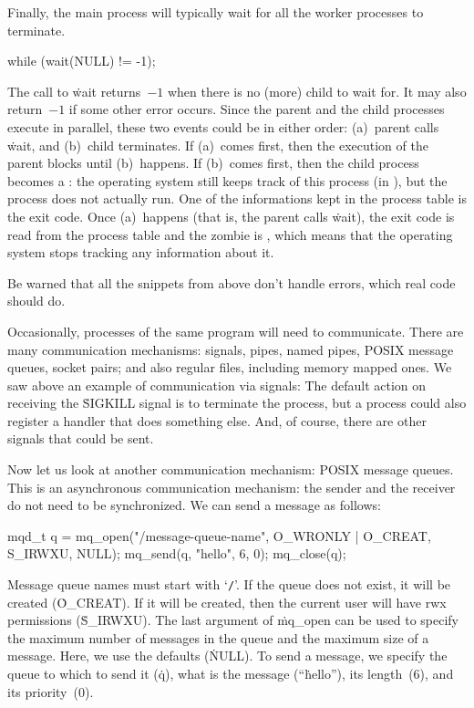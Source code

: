 Finally,
  the main process will typically wait for all the worker processes to terminate.
\begin{ccode}
while (wait(NULL) != -1);
\end{ccode}
The call to \.{wait} returns~$-1$ when there is no (more) child to wait for.
It may also return~$-1$ if some other error occurs.
Since the parent and the child processes execute in parallel,
  these two events could be in either order:
  (a)~parent calls \.{wait}, and
  (b)~child terminates.
If (a)~comes first, then the execution of the parent blocks until (b)~happens.
If (b)~comes first, then the child process becomes a :
  the operating system still keeps track of this process (in ),
  but the process does not actually run.
One of the informations kept in the process table is the exit code.
Once (a)~happens (that is, the parent calls \.{wait}),
  the exit code is read from the process table and the zombie is ,
  which means that the operating system stops tracking any information about it.

Be warned that all the snippets from above don't handle errors,
  which real code should do.

\medskip

Occasionally, processes of the same program will need to communicate.
There are many communication mechanisms:
  signals, pipes, named pipes, POSIX message queues, socket pairs;
  and also regular files, including memory mapped ones.
We saw above an example of communication via signals:
The default action on receiving the \.{SIGKILL} signal is to terminate the process,
  but a process could also register a handler that does something else.
And, of course, there are other signals that could be sent.

Now let us look at another communication mechanism: POSIX message queues.
This is an asynchronous communication mechanism:
  the sender and the receiver do not need to be synchronized.
We can send a message as follows:
\begin{ccode}
mqd_t q = mq_open("/message-queue-name", O_WRONLY | O_CREAT, S_IRWXU, NULL);
mq_send(q, "hello", 6, 0);
mq_close(q);
\end{ccode}
Message queue names must start with `{\tt /}'.
If the queue does not exist, it will be created (\.{O\_CREAT}).
If it will be created, then the current user will have rwx permissions (\.{S\_IRWXU}).
The last argument of \.{mq\_open} can be used to specify
  the maximum number of messages in the queue
  and the maximum size of a message.
Here, we use the defaults (\.{NULL}).
To send a message, we specify the queue to which to send it (\.{q}),
  what is the message (``\.{hello}''),
  its length~(6),
  and its priority~(0).

